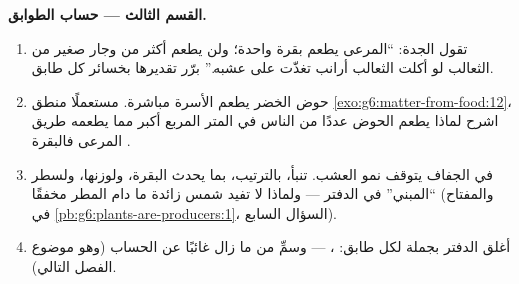 \begin{problem}
\medskip\noindent\textbf{القسم الثالث --- حساب
الطوابق.}
\begin{enumerate}[resume]
  \item تقول الجدة: ``المرعى يطعم بقرة واحدة؛ ولن يطعم أكثر من
        وجار صغير من الثعالب لو أكلت الثعالب أرانب تغذّت على
        عشبه.'' برّر تقديرها بخسائر كل طابق.
  \item حوض الخضر يطعم الأسرة مباشرة. مستعملًا منطق
        \cref{exo:g6:matter-from-food:12}، اشرح لماذا يطعم
        الحوض عددًا من الناس في المتر المربع أكبر مما يطعمه
        طريق المرعى فالبقرة .
  \item في الجفاف يتوقف نمو العشب. تنبأ، بالترتيب، بما يحدث
         البقرة، ولوزنها، ولسطر ``المبني'' في الدفتر ---
        ولماذا لا تفيد شمس زائدة ما دام المطر مخفقًا
        (والمفتاح في \cref{pb:g6:plants-are-producers:1}،
        السؤال السابع).
  \item أغلق الدفتر بجملة لكل طابق: ،  ---
        وسمِّ من ما زال غائبًا عن الحساب (وهو موضوع الفصل
        التالي).
\end{enumerate}
\end{problem}
